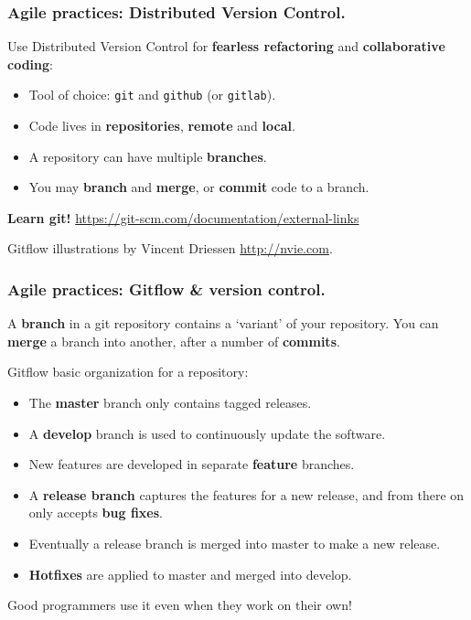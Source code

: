 \documentclass{beamer} %
\newcommand\emc[1]{\textcolor{midred}{\textbf{#1}}}
\begin{document}
\begin{frame}

\frametitle{Agile practices: Distributed Version Control.}

Use Distributed Version Control for \emc{fearless refactoring} and \emc{collaborative coding}:
\begin{itemize}
  \item Tool of choice: \texttt{git} and \texttt{github} (or \texttt{gitlab}).
  \item Code lives in \emc{repositories}, \emc{remote} and \emc{local}.
  \item A repository can have multiple \emc{branches}. 
  \item You may \emc{branch} and \emc{merge}, or \emc{commit} code to a branch.
\end{itemize}

\vspace{5mm}
\emc{Learn git!} \url{https://git-scm.com/documentation/external-links} 

\vspace{5mm}
Gitflow illustrations by Vincent Driessen \url{http://nvie.com}.


\end{frame}


\begin{frame}
\frametitle{Agile practices: Gitflow \& version control.}

A \emc{branch} in a git repository contains a `variant' of your repository. You can \emc{merge} a branch into another, after a number of \emc{commits}.

\vspace{5mm}
Gitflow basic organization for a repository:
\begin{itemize}
  \item The \emc{master} branch only contains tagged releases.
  \item A \emc{develop} branch is used to continuously update the software.
  \item New features are developed in separate \emc{feature} branches.
  \item A \emc{release branch} captures the features for a new release, and from there on only accepts \emc{bug fixes}.
  \item Eventually a release branch is merged into master to make a new release.
  \item \emc{Hotfixes} are applied to master and merged into develop. 
  \end{itemize}

Good programmers use it even when they work on their own!
\end{frame}
\end{document}

